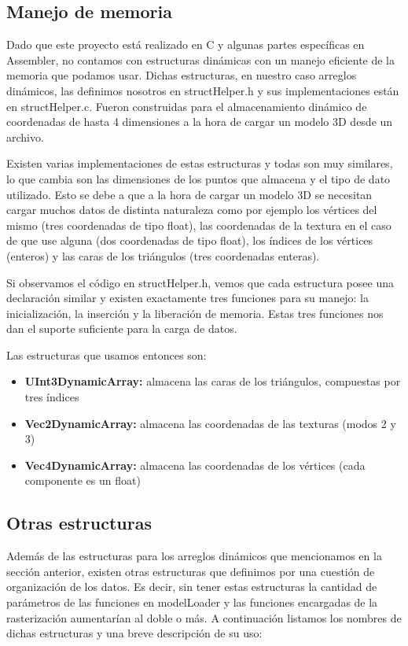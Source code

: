 \documentclass[a4paper]{article}
\begin{document}
\subsection{Manejo de memoria}
Dado que este proyecto está realizado en C y algunas partes específicas en Assembler, no contamos con estructuras dinámicas con un manejo eficiente de la memoria que podamos usar. Dichas estructuras, en nuestro caso arreglos dinámicos, las definimos nosotros en structHelper.h y sus implementaciones están en structHelper.c. Fueron construidas para el almacenamiento dinámico de coordenadas de hasta 4 dimensiones a la hora de cargar un modelo 3D desde un archivo.
\par Existen varias implementaciones de estas estructuras y todas son muy similares, lo que cambia son las dimensiones de los puntos que almacena y el tipo de dato utilizado. Esto se debe a que a la hora de cargar un modelo 3D se necesitan cargar muchos datos de distinta naturaleza como por ejemplo los vértices del mismo (tres coordenadas de tipo float), las coordenadas de la textura en el caso de que use alguna (dos coordenadas de tipo float), los índices de los vértices (enteros) y las caras de los triángulos (tres coordenadas enteras).
\par Si observamos el código en structHelper.h, vemos que cada estructura posee una declaración similar y existen exactamente tres funciones para su manejo: la inicialización, la inserción y la liberación de memoria. Estas tres funciones nos dan el suporte suficiente para la carga de datos.

Las estructuras que usamos entonces son:
\begin{itemize}
\item \textbf{UInt3DynamicArray: } almacena las caras de los triángulos, compuestas por tres índices
\item \textbf{Vec2DynamicArray: } almacena las coordenadas de las texturas (modos 2 y 3)
\item \textbf{Vec4DynamicArray: } almacena las coordenadas de los vértices (cada componente es un float)
\end{itemize}

\subsection{Otras estructuras}
Además de las estructuras para los arreglos dinámicos que mencionamos en la sección anterior, existen otras estructuras que definimos por una cuestión de organización de los datos. Es decir, sin tener estas estructuras la cantidad de parámetros de las funciones en modelLoader y las funciones encargadas de la rasterización aumentarían al doble o más. A continuación listamos los nombres de dichas estructuras y una breve descripción de su uso:
\end{document}
